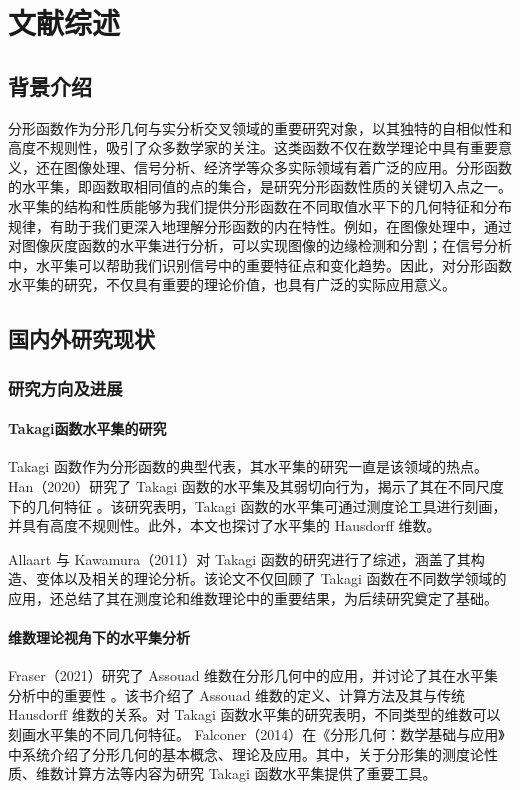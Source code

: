 \cleardoublepage
\newrefsection
\chapter{文献综述}

\section{背景介绍}
分形函数作为分形几何与实分析交叉领域的重要研究对象，以其独特的自相似性和高度不规则性，吸引了众多数学家的关注。这类函数不仅在数学理论中具有重要意义，还在图像处理、信号分析、经济学等众多实际领域有着广泛的应用。分形函数的水平集，即函数取相同值的点的集合，是研究分形函数性质的关键切入点之一。水平集的结构和性质能够为我们提供分形函数在不同取值水平下的几何特征和分布规律，有助于我们更深入地理解分形函数的内在特性。例如，在图像处理中，通过对图像灰度函数的水平集进行分析，可以实现图像的边缘检测和分割；在信号分析中，水平集可以帮助我们识别信号中的重要特征点和变化趋势。因此，对分形函数水平集的研究，不仅具有重要的理论价值，也具有广泛的实际应用意义。
\section{国内外研究现状}

\subsection{研究方向及进展}
\subsubsection{Takagi函数水平集的研究}
Takagi 函数作为分形函数的典型代表，其水平集的研究一直是该领域的热点。Han（2020）研究了 Takagi 函数的水平集及其弱切向行为，揭示了其在不同尺度下的几何特征 \cite{1}。该研究表明，Takagi 函数的水平集可通过测度论工具进行刻画，并具有高度不规则性。此外，本文也探讨了水平集的 Hausdorff 维数。

Allaart 与 Kawamura（2011）对 Takagi 函数的研究进行了综述，涵盖了其构造、变体以及相关的理论分析\cite{2}。该论文不仅回顾了 Takagi 函数在不同数学领域的应用，还总结了其在测度论和维数理论中的重要结果，为后续研究奠定了基础。

\subsubsection{维数理论视角下的水平集分析}
Fraser（2021）研究了 Assouad 维数在分形几何中的应用，并讨论了其在水平集分析中的重要性 \cite{3}。该书介绍了 Assouad 维数的定义、计算方法及其与传统 Hausdorff 维数的关系。对 Takagi 函数水平集的研究表明，不同类型的维数可以刻画水平集的不同几何特征。
Falconer（2014）在《分形几何：数学基础与应用》中系统介绍了分形几何的基本概念、理论及应用\cite{4}。其中，关于分形集的测度论性质、维数计算方法等内容为研究 Takagi 函数水平集提供了重要工具。

